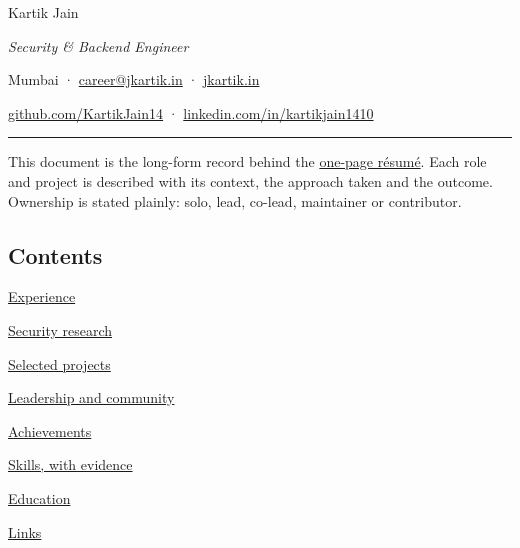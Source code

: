 \thispagestyle{cover}

\vspace*{14mm}
\par
\vspace{16pt}
{\fontsize{50}{54}\selectfont Kartik Jain}\par
\vspace{9pt}
{\fontsize{20}{24}\selectfont\itshape Security \& Backend Engineer}\par
\vspace{18pt}
{\sffamily\small\color{muted}%
Mumbai \enspace·\enspace
\href{mailto:career@jkartik.in}{career@jkartik.in} \enspace·\enspace
\href{https://jkartik.in}{jkartik.in}\par
\vspace{1pt}
\href{https://github.com/KartikJain14}{github.com/KartikJain14} \enspace·\enspace
\href{https://www.linkedin.com/in/kartikjain1410}{linkedin.com/in/kartikjain1410}\par}
\vspace{14pt}
{\color{hair}\rule{\linewidth}{0.5pt}}
\vspace{8pt}

This document is the long-form record behind the
\href{https://jkartik.in/Kartik_Resume.pdf}{one-page résumé}. Each role and project is described
with its context, the approach taken and the outcome. Ownership is stated plainly: solo, lead,
co-lead, maintainer or contributor.

\vfill

\subsection*{Contents}
\vspace{2pt}
\newcommand{\tocrow}[3]{\noindent\makebox[8mm][l]{\sffamily\footnotesize\color{accent}#1}\hyperref[#3]{#2}\hfill{\sffamily\footnotesize\color{muted}\pageref*{#3}}\par\vspace{2.5pt}}
\noindent\begin{minipage}[t]{0.56\linewidth}
\setlength{\parskip}{0pt}
\tocrow{01}{Experience}{sec:exp}
\tocrow{02}{Security research}{sec:research}
\tocrow{03}{Selected projects}{sec:projects}
\tocrow{04}{Leadership and community}{sec:lead}
\tocrow{05}{Achievements}{sec:awards}
\tocrow{06}{Skills, with evidence}{sec:skills}
\tocrow{07}{Education}{sec:edu}
\tocrow{08}{Links}{sec:links}
\end{minipage}\par
\vspace{6mm}

